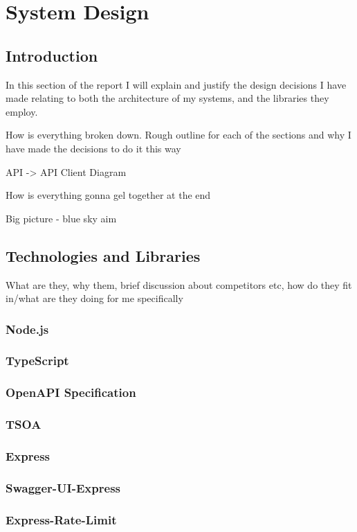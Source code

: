 \chapter{System Design}
\section{Introduction}
In this section of the report I will explain and justify the design decisions I have made relating to both the architecture of my systems, and the libraries they employ.

How is everything broken down. Rough outline for each of the sections and why I have made the decisions to do it this way

API -> API Client Diagram

How is everything gonna gel together at the end

Big picture - blue sky aim 

\section{Technologies and Libraries}

What are they, why them, brief discussion about competitors etc, how do they fit in/what are they doing for me specifically

    \subsection{Node.js}
    \subsection{TypeScript}
    \subsection{OpenAPI Specification}
    \subsection{TSOA}
    \subsection{Express}
    \subsection{Swagger-UI-Express}
    \subsection{Express-Rate-Limit}
